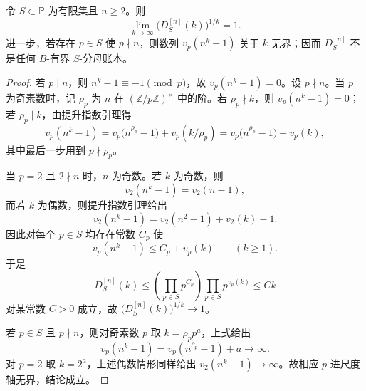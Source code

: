 \begin{lemma}[有限尺度账本的次指数性与无界轴]\label{lem:distill-cdim-scaling-denominator-subexponential}
令 \(S\subset\mathbb P\) 为有限集且 \(n\ge2\)。则
\[
\lim_{k\to\infty}\bigl(D^{[n]}_{S}(k)\bigr)^{1/k}=1.
\]
进一步，若存在 \(p\in S\) 使 \(p\nmid n\)，则数列 \(v_p(n^k-1)\) 关于 \(k\) 无界；因而 \(D^{[n]}_{S}\) 不是任何 \(B\)-有界 \(S\)-分母账本。
\end{lemma}
\begin{proof}
若 \(p\mid n\)，则 \(n^k-1\equiv -1\pmod p\)，故 \(v_p(n^k-1)=0\)。设 \(p\nmid n\)。当 \(p\) 为奇素数时，记 \(\rho_p\) 为 \(n\) 在 \((\mathbb Z/p\mathbb Z)^\times\) 中的阶。若 \(\rho_p\nmid k\)，则 \(v_p(n^k-1)=0\)；若 \(\rho_p\mid k\)，由提升指数引理得
\[
v_p(n^k-1)=v_p\bigl(n^{\rho_p}-1\bigr)+v_p(k/\rho_p)
=v_p\bigl(n^{\rho_p}-1\bigr)+v_p(k),
\]
其中最后一步用到 \(p\nmid\rho_p\)。

当 \(p=2\) 且 \(2\nmid n\) 时，\(n\) 为奇数。若 \(k\) 为奇数，则
\[
v_2(n^k-1)=v_2(n-1),
\]
而若 \(k\) 为偶数，则提升指数引理给出
\[
v_2(n^k-1)=v_2(n^2-1)+v_2(k)-1.
\]
因此对每个 \(p\in S\) 均存在常数 \(C_p\) 使
\[
v_p(n^k-1)\le C_p+v_p(k)
\qquad(k\ge1).
\]
于是
\[
D^{[n]}_{S}(k)\le
\left(\prod_{p\in S}p^{C_p}\right)
\prod_{p\in S}p^{v_p(k)}
\le C k
\]
对某常数 \(C>0\) 成立，故 \(\bigl(D^{[n]}_{S}(k)\bigr)^{1/k}\to1\)。

若 \(p\in S\) 且 \(p\nmid n\)，则对奇素数 \(p\) 取 \(k=\rho_p p^a\)，上式给出
\[
v_p(n^k-1)=v_p(n^{\rho_p}-1)+a\to\infty.
\]
对 \(p=2\) 取 \(k=2^a\)，上述偶数情形同样给出 \(v_2(n^k-1)\to\infty\)。故相应 \(p\)-进尺度轴无界，结论成立。
\end{proof}


